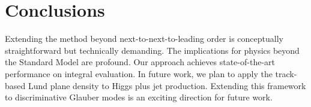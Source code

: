 \section{Conclusions}\label{sec:conclusions}

Extending the method beyond next-to-next-to-leading order is
conceptually straightforward but technically demanding. The implications
for physics beyond the Standard Model are profound. Our approach
achieves state-of-the-art performance on integral evaluation. In future
work, we plan to apply the track-based Lund plane density to Higgs plus
jet production. Extending this framework to discriminative Glauber modes
is an exciting direction for future work.

